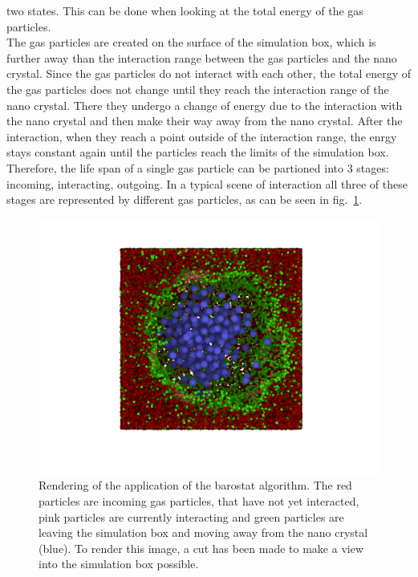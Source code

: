 \documentclass[12pt]{article}
\begin{document}
two states. This can be done when looking at the total energy of the gas particles.\\
The gas particles are created on the surface of the simulation box, which is further away than the interaction range between the gas particles and the
nano crystal. Since the gas particles do not interact with each other, the total energy of the gas particles does not change until they reach the
interaction range of the nano crystal. There they undergo a change of energy due to the interaction with the nano crystal and then make their way away
from the nano crystal. After the interaction, when they reach a point outside of the interaction range, the enrgy stays constant again until the
particles reach the limits of the simulation box.\\
Therefore, the life span of a single gas particle can be partioned into 3 stages: incoming, interacting, outgoing. In a typical scene of interaction
all three of these stages are represented by different gas particles, as can be seen in fig.~\ref{fig:barointeraction}.\\
\begin{figure}[h]
    \begin{center}
        \includegraphics[scale=0.4]{images/baro_170105_new_medium.png}
        \caption{Rendering of the application of the barostat algorithm. The red particles are incoming gas particles, that have not yet interacted, 
            pink particles are currently interacting and green particles are leaving the simulation box and
        moving away from the nano crystal (blue). To render this image, a cut has been made to make a view into the simulation box possible.}
        \label{fig:barointeraction}
    \end{center}
\end{figure}
\end{document}

